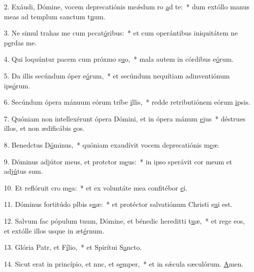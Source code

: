 2. Exáudi, Dómine, vocem deprecatiónis meǽdum ro \uline{a}d te:~* dum extóllo manus meas ad templum sanctum t\uline{u}um.\par 
3. Ne simul trahas me cum pccat\uline{ó}ribus:~* et cum operántibus iniquitátem ne p\uline{e}rdas me.\par 
4. Qui loquúntur pacem cum próxmo s\uline{u}o,~* mala autem in córdibus e\uline{ó}rum.\par 
5. Da illis secúndum óper e\uline{ó}rum,~* et secúndum nequítiam adinventiónum ips\uline{ó}rum.\par 
6. Secúndum ópera mánuum eórum tríbe \uline{i}llis,~* redde retributiónem eórum \uline{i}psis.\par 
7. Quóniam non intellexérunt ópera Dómini, et in ópera mánum \uline{e}jus~* déstrues illos, et non ædificábis \uline{e}os.\par 
8. Benedctus D\uline{ó}minus,~* quóniam exaudívit vocem deprecatiónis m\uline{e}æ.\par 
9. Dóminus adjútor meus, et protctor m\uline{e}us:~* in ipso sperávit cor meum et adj\uline{ú}tus sum.\par 
10. Et reflóruit cro m\uline{e}a:~* et ex voluntáte mea confitébor \uline{e}i.\par 
11. Dóminus fortitúdo plbis s\uline{u}æ:~* et protéctor salvatiónum Christi s\uline{u}i est.\par 
12. Salvum fac pópulum tuum, Dómine, et bénedic hereditti t\uline{u}æ,~* et rege eos, et extólle illos usque in æt\uline{é}rnum.\par 
13. Glória Patr, et F\uline{í}lio,~* et Spirítui S\uline{a}ncto.\par 
14. Sicut erat in princípio, et nnc, et s\uline{e}mper,~* et in sǽcula sæculórum. \uline{A}men.\par 
